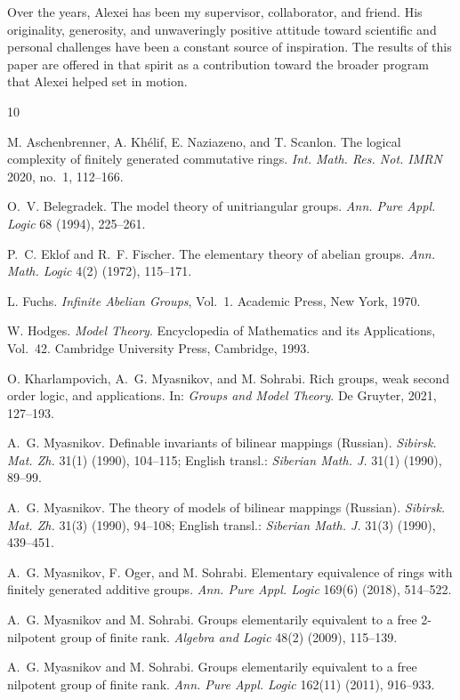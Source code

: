 \documentclass{article}
\theoremstyle{remark}
\begin{document}
Over the years, Alexei has been my supervisor, collaborator, and friend. His originality, generosity, and unwaveringly positive attitude toward scientific and personal challenges have been a constant source of inspiration. The results of this paper are offered in that spirit as a contribution toward the broader program that Alexei helped set in motion.
\begin{thebibliography}{10}

 M. Aschenbrenner, A. Kh\'elif, E. Naziazeno, and T. Scanlon. The logical complexity of finitely generated commutative rings. \emph{Int. Math. Res. Not. IMRN} 2020, no.~1, 112--166.

 O.~V. Belegradek. The model theory of unitriangular groups. \emph{Ann. Pure Appl. Logic} 68 (1994), 225--261.

 P.~C. Eklof and R.~F. Fischer. The elementary theory of abelian groups. \emph{Ann. Math. Logic} 4(2) (1972), 115--171.

 L. Fuchs. \emph{Infinite Abelian Groups}, Vol.~1. Academic Press, New York, 1970.

 W. Hodges. \emph{Model Theory}. Encyclopedia of Mathematics and its Applications, Vol.~42. Cambridge University Press, Cambridge, 1993.

 O. Kharlampovich, A.~G. Myasnikov, and M. Sohrabi. Rich groups, weak second order logic, and applications. In: \emph{Groups and Model Theory}. De Gruyter, 2021, 127--193.

 A.~G. Myasnikov. Definable invariants of bilinear mappings (Russian). \emph{Sibirsk. Mat. Zh.} 31(1) (1990), 104--115; English transl.: \emph{Siberian Math. J.} 31(1) (1990), 89--99.

 A.~G. Myasnikov. The theory of models of bilinear mappings (Russian). \emph{Sibirsk. Mat. Zh.} 31(3) (1990), 94--108; English transl.: \emph{Siberian Math. J.} 31(3) (1990), 439--451.

 A.~G. Myasnikov, F. Oger, and M. Sohrabi. Elementary equivalence of rings with finitely generated additive groups. \emph{Ann. Pure Appl. Logic} 169(6) (2018), 514--522.

 A.~G. Myasnikov and M. Sohrabi. Groups elementarily equivalent to a free 2-nilpotent group of finite rank. \emph{Algebra and Logic} 48(2) (2009), 115--139.

 A.~G. Myasnikov and M. Sohrabi. Groups elementarily equivalent to a free nilpotent group of finite rank. \emph{Ann. Pure Appl. Logic} 162(11) (2011), 916--933.


\end{thebibliography}
\end{document}
